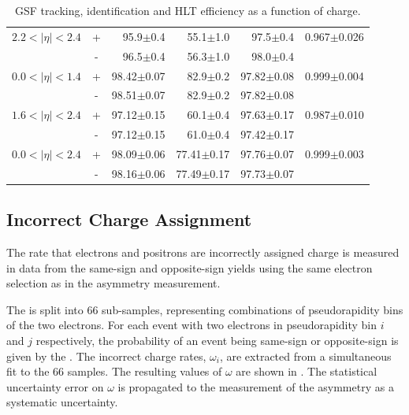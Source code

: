 \begin{table}[htbp]
\begin{center}
\begin{tabular}{lcrrrr}
$2.2<| \eta |<2.4$ &+& 95.9$\pm$0.4 &55.1$\pm$1.0 &97.5$\pm$0.4 & 0.967$\pm$0.026\\
                   &-& 96.5$\pm$0.4 &56.3$\pm$1.0 &98.0$\pm$0.4 & \\
\midrule
$0.0<| \eta |<1.4$ &+& 98.42$\pm$0.07 &82.9$\pm$0.2 &97.82$\pm$0.08 & 0.999$\pm$0.004\\
                   &-& 98.51$\pm$0.07 &82.9$\pm$0.2 &97.82$\pm$0.08 & \\
$1.6<| \eta |<2.4$ &+& 97.12$\pm$0.15 &60.1$\pm$0.4 &97.63$\pm$0.17 & 0.987$\pm$0.010\\
                   &-& 97.12$\pm$0.15 &61.0$\pm$0.4 &97.42$\pm$0.17 & \\
\midrule
$0.0<| \eta |<2.4$ &+& 98.09$\pm$0.06 &77.41$\pm$0.17 &97.76$\pm$0.07 & 0.999$\pm$0.003\\
                   &-& 98.16$\pm$0.06 &77.49$\pm$0.17 &97.73$\pm$0.07 & \\
\bottomrule
\end{tabular}
\end{center}
\caption[GSF tracking, identification and HLT efficiency as a function of
charge.] {\label{tab:updatedefficiency} GSF tracking, identification and HLT
efficiency as a function of charge\cite{bendavid2011electron}.}
\end{table}

\subsection{Incorrect Charge Assignment}
The rate that electrons and positrons are incorrectly assigned charge is measured
in data from the same-sign and opposite-sign \PZ yields using the same electron
selection as in the asymmetry measurement.

The \HepProcess{\PZ\to\Pe\Pe} is split into 66 sub-samples, representing
combinations of pseudorapidity bins of the two electrons.
For each \PZ event with two electrons in pseudorapidity bin $i$ and $j$
respectively, the probability of an event being same-sign or opposite-sign is
given by the . The incorrect charge rates,
$\omega_i$, are extracted from a simultaneous fit to the 66 samples.
The resulting values of $\omega$ are shown in . The
statistical uncertainty error on $\omega$ is propagated to the measurement of the
asymmetry as a systematic uncertainty.

